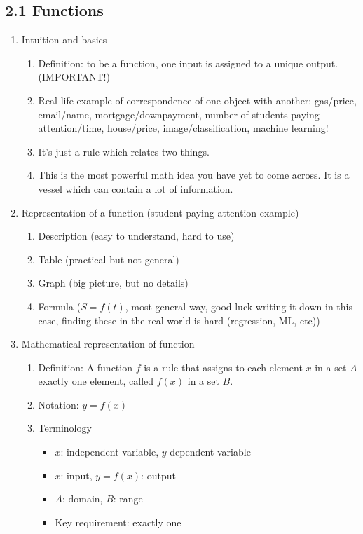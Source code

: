 \documentclass{article}
\begin{document}
\subsection{2.1 Functions}

\begin{enumerate}

\item Intuition and basics
\begin{enumerate}
\item Definition: to be a function, one input is assigned to a unique output. (IMPORTANT!)
\item Real life example of correspondence of one object with another: gas/price, email/name, mortgage/downpayment, number of students paying attention/time, house/price, image/classification, machine learning!
\item It's just a rule which relates two things.
\item This is the most powerful math idea you have yet to come across. It is a vessel which can contain a lot of information.
\end{enumerate}

\item Representation of a function (student paying attention example)
\begin{enumerate}
\item Description (easy to understand, hard to use)
\item Table (practical but not general)
\item Graph (big picture, but no details)
\item Formula ($S=f(t)$, most general way, good luck writing it down in this case, finding these in the real world is hard (regression, ML, etc))
\end{enumerate}

\item Mathematical representation of function
\begin{enumerate}
\item Definition: A function $f$ is a rule that assigns to each element $x$ in a set $A$ exactly one element, called $f(x)$ in a set $B$.
\item Notation: $y = f(x)$
\item Terminology
\begin{itemize}
\item $x$: independent variable, $y$ dependent variable
\item $x$: input, $y=f(x)$: output
\item $A$: domain, $B$: range
\item Key requirement: exactly one
\end{itemize}
\end{enumerate}



\end{enumerate}
\end{document}

